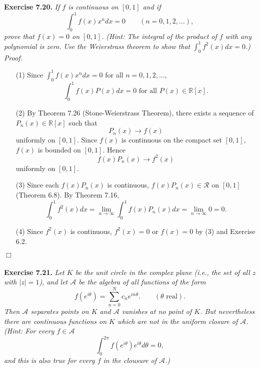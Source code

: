 \documentclass{article}
\begin{document}



\textbf{Exercise 7.20.}
\emph{If $f$ is continuous on $[0,1]$ and if
\[
  \int_{0}^{1} f(x) x^n dx = 0
  \qquad
  (n=0,1,2,\ldots),
\]
prove that $f(x) = 0$ on $[0,1]$.
(Hint: The integral of the product of $f$ with any polynomial is zero.
Use the Weierstrass theorem to show that
$\int_{0}^{1} f^2(x) dx = 0$.)} \\

\emph{Proof.}
\begin{enumerate}
\item[(1)]
Since $\int_{0}^{1} f(x) x^n dx = 0$ for all $n = 0,1,2,\ldots$,
\[
  \int_{0}^{1} f(x) P(x) dx = 0 \text{ for all } P(x) \in \mathbb{R}[x].
\]

\item[(2)]
By Theorem 7.26 (Stone-Weierstrass Theorem),
there exists a sequence of $P_n(x) \in \mathbb{R}[x]$ such that
\[
  P_n(x) \to f(x)
\]
uniformly on $[0,1]$.
Since $f(x)$ is continuous on the compact set $[0,1]$, $f(x)$ is bounded on $[0,1]$.
Hence
\[
  f(x) P_n(x) \to f^2(x)
\]
uniformly on $[0,1]$.

\item[(3)]
Since each $f(x) P_n(x)$ is continuous,
$f(x) P_n(x) \in \mathscr{R}$ on $[0,1]$ (Theorem 6.8).
By Theorem 7.16,
\[
  \int_{0}^{1} f^2(x) dx
  = \lim_{n \to \infty} \int_{0}^{1} f(x) P_n(x) dx
  = \lim_{n \to \infty} 0
  = 0.
\]

\item[(4)]
Since $f^2(x)$ is continuous,
$f^2(x) = 0$ or $f(x) = 0$ by (3) and Exercise 6.2.
\end{enumerate}
$\Box$ \\\\






\textbf{Exercise 7.21.}
\emph{Let $K$ be the unit circle in the complex plane
(i.e., the set of all $z$ with $|z|=1$),
and let $\mathscr{A}$ be the algebra of all functions of the form
\[
  f(e^{i\theta}) = \sum_{n=0}^{N} c_n e^{in\theta}.
  \qquad
  (\theta \text{ real}).
\]
Then $\mathscr{A}$ separates points on $K$ and
$\mathscr{A}$ vanishes at no point of $K$.
But nevertheless there are continuous functions on $K$ which
are not in the uniform closure of $\mathscr{A}$.
(Hint: For every $f \in \mathscr{A}$
\[
  \int_{0}^{2\pi} f(e^{i\theta})e^{i\theta}d\theta = 0,
\]
and this is also true for every $f$ in the clousure of $\mathscr{A}$.)} \\
\end{document}

